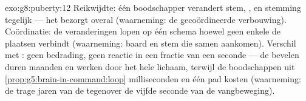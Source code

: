 \begin{solution}{exo:g8:puberty:12}
Reikwijdte: één boodschapper verandert stem, ,  en stemming
tegelijk --- het  bezorgt overal (waarneming: de gecoördineerde
verbouwing). Coördinatie: de veranderingen lopen op één schema hoewel geen
enkele  de plaatsen verbindt (waarneming: baard en stem die samen
aankomen). Verschil met : geen bedrading, geen reactie in een
fractie van een seconde --- de bevelen duren maanden en werken door het
hele lichaam, terwijl de boodschappen uit
\cref{prop:g5:brain-in-command:loop} milliseconden en één pad kosten
(waarneming: de trage jaren van de  tegenover de vijfde seconde
van de vangbeweging).
\end{solution}

